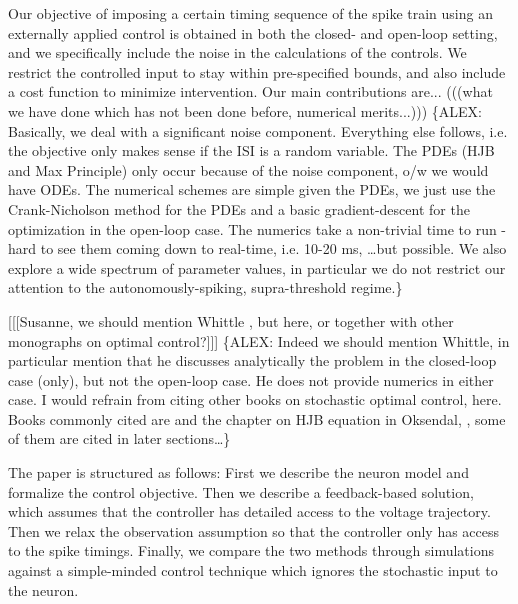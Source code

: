 \documentclass{article}
\begin{document}
Our objective of imposing a certain timing sequence of the spike train using an
externally applied control is obtained in both the closed- and
open-loop setting, and we specifically include the noise in the
calculations of the controls. We restrict the controlled input to stay
within pre-specified bounds, and also include a cost function to
minimize intervention.
Our main contributions are... (((what we have done which has not been
done before, numerical merits...)))
\{ALEX: Basically, we deal with a significant noise component. Everything
else follows, i.e. the objective only makes sense if the ISI is a random variable.
The PDEs (HJB and Max Principle) only occur because of the noise
component, o/w we would have ODEs. The numerical schemes are simple given the
PDEs, we just use the Crank-Nicholson method for the PDEs and a basic
gradient-descent for the optimization in the open-loop case. The numerics take a
non-trivial time to run - hard to see them coming down to real-time, i.e.
10-20 ms, \ldots but possible. We also explore a wide spectrum of parameter
values, in particular we do  not restrict our attention to the
autonomously-spiking, supra-threshold regime.\}

[[[Susanne, we should mention Whittle \cite{Whittle1996}, but here, or together
with other monographs on optimal control?]]] \{ALEX: Indeed we should mention
Whittle, in particular mention that he discusses analytically the problem in the
closed-loop case (only), but not the open-loop case. He does not provide
numerics in either case. I would refrain from citing other books on
stochastic optimal control, here. Books commonly cited are
\cite{Fleming1975,Krylov2008} and the chapter on HJB equation in Oksendal,
\cite{Oksendal2007}, some of them are cited in later sections\ldots\}

The paper is structured as follows: First we describe the neuron model and
formalize the control objective. Then we describe a feedback-based solution,
which assumes that the controller has detailed access to the voltage trajectory.
Then we relax the observation assumption so that the controller only has access
to the spike timings. Finally, we compare the two methods through
simulations against a simple-minded control technique which ignores
the stochastic input to the neuron.
\end{document}

